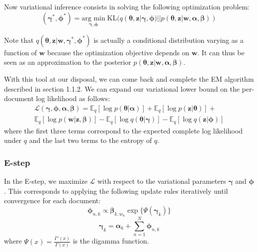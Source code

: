 \documentclass{article}
\begin{document}
Now variational inference consists in solving the following optimization problem:
\begin{equation}
(\bm{\gamma}^*, \bm{\phi}^*) =
\underset{\bm{\gamma}, \bm{\phi}}{\text{arg min}}\;
	\mathrm{KL}(q(\bm{\theta}, \mathbf{z} | \bm{\gamma}, \bm{\phi}) || p(\bm{\theta}, \mathbf{z} | \mathbf{w}, \bm{\alpha}, \bm{\beta}))
\end{equation}

Note that $q(\bm{\theta}, \mathbf{z} | \mathbf{w}, \bm{\gamma}^*, \bm{\phi}^*)$ is actually a conditional distribution varying as a function of $\mathbf{w}$ because the optimization objective depends on $\mathbf{w}$. It can thus be seen as an approximation to the posterior $p(\bm{\theta}, \mathbf{z} | \mathbf{w}, \bm{\alpha}, \bm{\beta})$.

With this tool at our disposal, we can come back and complete the EM algorithm described in section 1.1.2. We can expand our variational lower bound on the per-document log likelihood as follows:
\begin{multline}
\mathcal{L}(\bm{\gamma}, \bm{\phi},\bm{\alpha}, \bm{\beta}) = 
\mathbb{E}_q [\log p(\bm{\theta} | \bm{\alpha})] + 
\mathbb{E}_q [\log p(\mathbf{z} | \bm{\theta})] + \\
\mathbb{E}_q [\log p(\mathbf{w} | \mathbf{z}, \bm{\beta})] -
\mathbb{E}_q [\log q(\bm{\theta} | \bm{\gamma})] -
\mathbb{E}_q [\log q(\mathbf{z} | \bm{\phi})]
\end{multline}
where the first three terms correspond to the expected complete log likelihood under $q$ and the last two terms to the entropy of $q$.

\subsubsection{E-step}
In the E-step, we maximize $\mathcal{L}$ with respect to the variational parameters $\bm{\gamma}$ and $\bm{\phi}$. This corresponds to applying the following update rules iteratively until convergence for each document:
\begin{equation} 
\label{phi_update}
\bm{\phi}_{n,k} \propto \bm{\beta}_{k, w_n} \exp\{\Psi(\bm{\gamma}_k)\}
\end{equation}
\begin{equation}
\label{gamma_update}
\bm{\gamma}_{k} = \bm{\alpha}_{k} + \sum_{n=1}^N \bm{\phi}_{n,k}
\end{equation}
where $\Psi(x) = \frac{\Gamma'(x)}{\Gamma(x)}$ is the digamma function.
\end{document}
